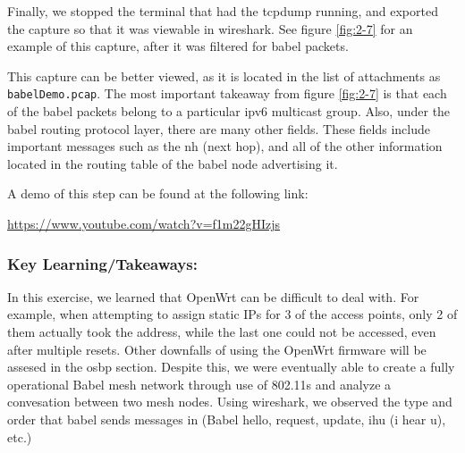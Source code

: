 \documentclass[main.tex]{subfiles}
\begin{document}

Finally, we stopped the terminal that had the tcpdump running, and exported the capture so that it was viewable in wireshark. See figure \ref{fig:2-7} for an example of this capture, after it was filtered for babel packets.


This capture can be better viewed, as it is located in the list of attachments as \texttt{babelDemo.pcap}. The most important takeaway from figure \ref{fig:2-7} is that each of the babel packets belong to a particular ipv6 multicast group. Also, under the babel routing protocol layer, there are many other fields. These fields include important messages such as the nh (next hop), and all of the other information located in the routing table of the babel node advertising it. 


A demo of this step can be found at the following link:

\url{https://www.youtube.com/watch?v=f1m22gHIzjs}

\subsubsection{Key Learning/Takeaways:} 

In this exercise, we learned that OpenWrt can be difficult to deal with. For example, when attempting to assign static IPs for 3 of the access points, only 2 of them actually took the address, while the last one could not be accessed, even after multiple resets. Other downfalls of using the OpenWrt firmware will be assesed in the osbp section. Despite this, we were eventually able to create a fully operational Babel mesh network through use of 802.11s and analyze a convesation between two mesh nodes. Using wireshark, we observed the type and order that babel sends messages in (Babel hello, request, update, ihu (i hear u), etc.) 
\end{document}
